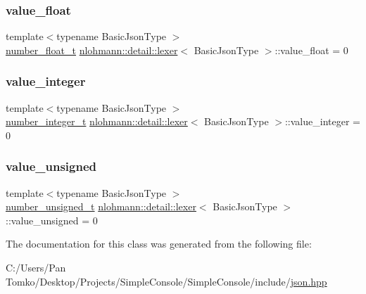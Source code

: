\subsubsection{\texorpdfstring{value\_float}{value\_float}}
{\footnotesize\ttfamily template$<$typename Basic\+Json\+Type $>$ \\
\mbox{\hyperlink{classnlohmann_1_1detail_1_1lexer_aa7f9e7b2bcd311fb86e2da43761a6619}{number\+\_\+float\+\_\+t}} \mbox{\hyperlink{classnlohmann_1_1detail_1_1lexer}{nlohmann\+::detail\+::lexer}}$<$ Basic\+Json\+Type $>$\+::value\+\_\+float = 0\hspace{0.3cm}{\ttfamily [private]}}

\mbox{\label{classnlohmann_1_1detail_1_1lexer_a353d8eeca5b2f21b3e88540c17afb9bc}} 
\subsubsection{\texorpdfstring{value\_integer}{value\_integer}}
{\footnotesize\ttfamily template$<$typename Basic\+Json\+Type $>$ \\
\mbox{\hyperlink{classnlohmann_1_1detail_1_1lexer_a9cd1b11cc67edbfb2613c788b5bd337c}{number\+\_\+integer\+\_\+t}} \mbox{\hyperlink{classnlohmann_1_1detail_1_1lexer}{nlohmann\+::detail\+::lexer}}$<$ Basic\+Json\+Type $>$\+::value\+\_\+integer = 0\hspace{0.3cm}{\ttfamily [private]}}

\mbox{\label{classnlohmann_1_1detail_1_1lexer_af250180459c23ca71c3e10a99fb5ba3e}} 
\subsubsection{\texorpdfstring{value\_unsigned}{value\_unsigned}}
{\footnotesize\ttfamily template$<$typename Basic\+Json\+Type $>$ \\
\mbox{\hyperlink{classnlohmann_1_1detail_1_1lexer_a105d1dfeab414a572655895cdd96a52a}{number\+\_\+unsigned\+\_\+t}} \mbox{\hyperlink{classnlohmann_1_1detail_1_1lexer}{nlohmann\+::detail\+::lexer}}$<$ Basic\+Json\+Type $>$\+::value\+\_\+unsigned = 0\hspace{0.3cm}{\ttfamily [private]}}



The documentation for this class was generated from the following file\+:\begin{DoxyCompactItemize}
\item 
C\+:/\+Users/\+Pan Tomko/\+Desktop/\+Projects/\+Simple\+Console/\+Simple\+Console/include/\mbox{\hyperlink{json_8hpp}{json.\+hpp}}\end{DoxyCompactItemize}

